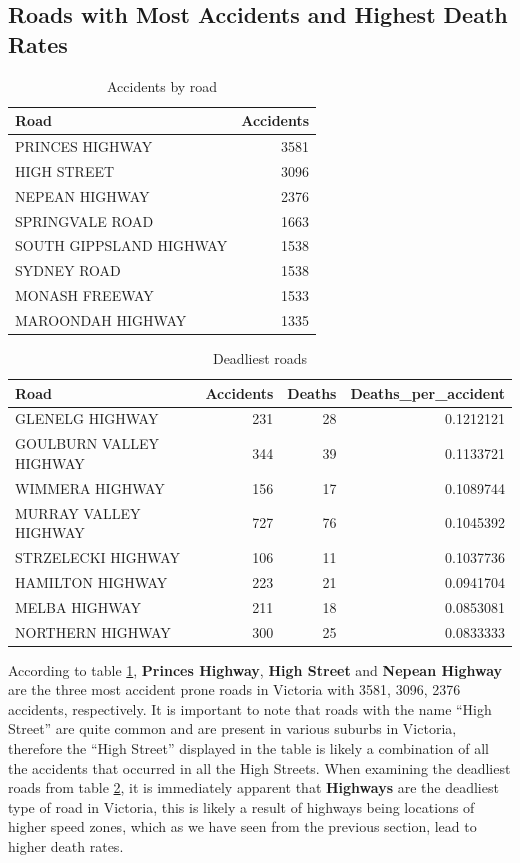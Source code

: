 \documentclass[11pt,a4paper,]{article}
\begin{document}
\subsection*{Roads with Most Accidents and Highest Death Rates}

\begin{table}

\caption{\label{tab:accidents-by-road}Accidents by road}
\centering
\begin{tabular}[t]{l|r}
\hline
Road & Accidents\\
\hline
PRINCES HIGHWAY & 3581\\
\hline
HIGH STREET & 3096\\
\hline
NEPEAN HIGHWAY & 2376\\
\hline
SPRINGVALE ROAD & 1663\\
\hline
SOUTH GIPPSLAND HIGHWAY & 1538\\
\hline
SYDNEY ROAD & 1538\\
\hline
MONASH FREEWAY & 1533\\
\hline
MAROONDAH HIGHWAY & 1335\\
\hline
\end{tabular}
\end{table}

\begin{table}

\caption{\label{tab:deadliest-road}Deadliest roads}
\centering
\begin{tabular}[t]{l|r|r|r}
\hline
Road & Accidents & Deaths & Deaths\_per\_accident\\
\hline
GLENELG HIGHWAY & 231 & 28 & 0.1212121\\
\hline
GOULBURN VALLEY HIGHWAY & 344 & 39 & 0.1133721\\
\hline
WIMMERA HIGHWAY & 156 & 17 & 0.1089744\\
\hline
MURRAY VALLEY HIGHWAY & 727 & 76 & 0.1045392\\
\hline
STRZELECKI HIGHWAY & 106 & 11 & 0.1037736\\
\hline
HAMILTON HIGHWAY & 223 & 21 & 0.0941704\\
\hline
MELBA HIGHWAY & 211 & 18 & 0.0853081\\
\hline
NORTHERN HIGHWAY & 300 & 25 & 0.0833333\\
\hline
\end{tabular}
\end{table}

According to table \ref{tab:accidents-by-road}, \textbf{Princes Highway}, \textbf{High Street} and \textbf{Nepean Highway} are the three most accident prone roads in Victoria with 3581, 3096, 2376 accidents, respectively. It is important to note that roads with the name ``High Street'' are quite common and are present in various suburbs in Victoria, therefore the ``High Street'' displayed in the table is likely a combination of all the accidents that occurred in all the High Streets. When examining the deadliest roads from table \ref{tab:deadliest-road}, it is immediately apparent that \textbf{Highways} are the deadliest type of road in Victoria, this is likely a result of highways being locations of higher speed zones, which as we have seen from the previous section, lead to higher death rates.
\end{document}
